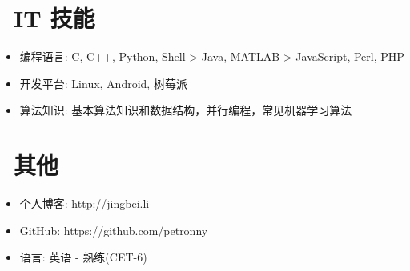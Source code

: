 \documentclass{resume}
\begin{document}

\section{\faCogs\ IT 技能}
\begin{itemize}[parsep=0.5ex]
	\item 编程语言: C, C++, Python, Shell > Java, MATLAB >  JavaScript, Perl, PHP
	\item 开发平台: Linux, Android, 树莓派
	\item 算法知识: 基本算法知识和数据结构，并行编程，常见机器学习算法
\end{itemize}


\section{\faInfo\ 其他}
\begin{itemize}[parsep=0.5ex]
	\item 个人博客: http://jingbei.li
	\item GitHub: https://github.com/petronny
	\item 语言: 英语 - 熟练(CET-6)
\end{itemize}

%
%
\end{document}
